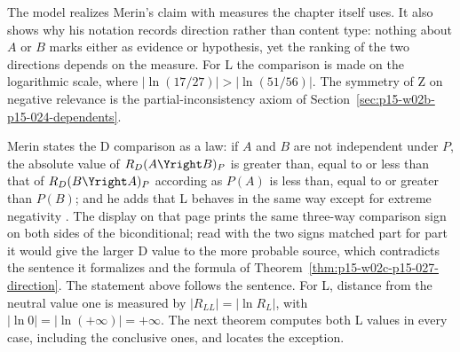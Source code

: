 The model realizes Merin's claim with measures the chapter itself uses.
It also shows why his notation records direction rather than content
type: nothing about \(A\) or \(B\) marks either as evidence or
hypothesis, yet the ranking of the two directions depends on the
measure. For L the comparison is made on the logarithmic scale, where
\(|\ln(17/27)|>|\ln(51/56)|\). The symmetry of Z on negative
relevance is the partial-inconsistency axiom of
Section~\ref{sec:p15-w02b-p15-024-dependents}.

Merin states the D comparison as a law: if \(A\) and \(B\) are not
independent under \(P\), the absolute value of
\(R_D(A\Yright B)_P\) is greater than, equal to or less than that of
\(R_D(B\Yright A)_P\) according as \(P(A)\) is less than, equal to or
greater than \(P(B)\); and he adds that L behaves in the same way except
for extreme negativity \cite[p.~272]{Merin2021Relevance}. The display on
that page prints the same three-way comparison sign on both sides of
the biconditional; read with the two signs matched part for part it
would give the larger D value to the more probable source, which
contradicts the sentence it formalizes and the formula of
Theorem~\ref{thm:p15-w02c-p15-027-direction}. The statement above follows
the sentence. For L, distance from the neutral value one is measured by
\(|R_{LL}|=|\ln R_L|\), with \(|\ln 0|=|\ln(+\infty)|=+\infty\). The next
theorem computes both L values in every case, including the conclusive
ones, and locates the exception.

